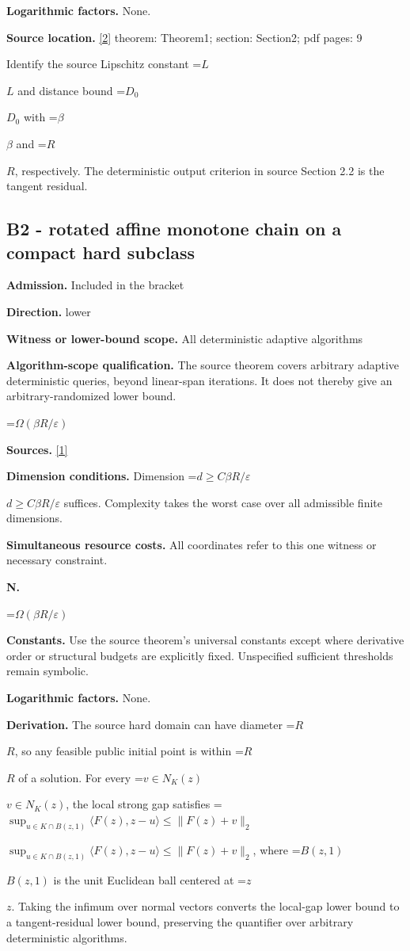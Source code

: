 \documentclass[10pt,a4paper]{article}
\newcommand{\AtlasMath}[1]{\par\begingroup\centering\setbox0=\hbox{$\displaystyle #1$}\ifdim\wd0>1.4\linewidth\typeout{ATLAS WIDE FORMULA: \the\wd0}\fi\ifdim\wd0>\linewidth\resizebox{\linewidth}{!}{\box0}\else\box0\fi\par\endgroup}
\newcommand{\AtlasInlineMath}[1]{\begingroup\setbox0=\hbox{$#1$}\ifdim\wd0>.4\linewidth\endgroup\AtlasMath{#1}\else\endgroup$#1$\fi}
\begin{document}
\textbf{Logarithmic factors.} None.

\textbf{Source location.} \href{https://arxiv.org/pdf/2609.04188v2}{[2]} theorem: Theorem1; section: Section2; pdf pages: 9

Identify the source Lipschitz constant \AtlasInlineMath{L} and distance bound \AtlasInlineMath{D_0} with \AtlasInlineMath{\beta} and \AtlasInlineMath{R}, respectively. The deterministic output criterion in source Section 2.2 is the tangent residual.

\subsection{B2 - rotated affine monotone chain on a compact hard subclass}
\textbf{Admission.} Included in the bracket

\textbf{Direction.} lower

\textbf{Witness or lower-bound scope.} All deterministic adaptive algorithms

\textbf{Algorithm-scope qualification.} The source theorem covers arbitrary adaptive deterministic queries, beyond linear-span iterations. It does not thereby give an arbitrary-randomized lower bound.

\AtlasMath{\Omega(\beta R/\varepsilon)}
\textbf{Sources.} \href{https://proceedings.mlr.press/v125/diakonikolas20a/diakonikolas20a.pdf}{[1]}

\textbf{Dimension conditions.} Dimension \AtlasInlineMath{d\ge C\beta R/\varepsilon} suffices. Complexity takes the worst case over all admissible finite dimensions.

\textbf{Simultaneous resource costs.} All coordinates refer to this one witness or necessary constraint.

\textbf{N.}

\AtlasMath{\Omega(\beta R/\varepsilon)}
\textbf{Constants.} Use the source theorem’s universal constants except where derivative order or structural budgets are explicitly fixed. Unspecified sufficient thresholds remain symbolic.

\textbf{Logarithmic factors.} None.

\textbf{Derivation.} The source hard domain can have diameter \AtlasInlineMath{R}, so any feasible public initial point is within \AtlasInlineMath{R} of a solution. For every \AtlasInlineMath{v\in N_K(z)}, the local strong gap satisfies \AtlasInlineMath{\sup_{u\in K\cap B(z,1)}\langle F(z),z-u\rangle\le\|F(z)+v\|_2}, where \AtlasInlineMath{B(z,1)} is the unit Euclidean ball centered at \AtlasInlineMath{z}. Taking the infimum over normal vectors converts the local-gap lower bound to a tangent-residual lower bound, preserving the quantifier over arbitrary deterministic algorithms.
\end{document}
